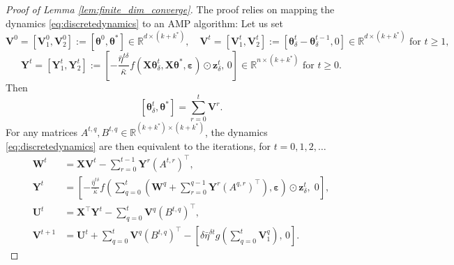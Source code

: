 \documentclass[11pt,letterpaper,reqno]{amsart}
\theoremstyle{definition}
\def\R{\mathbb{R}}
\def\z{\mathbf{z}}
\def\U{\mathbf{U}}
\def\V{\mathbf{V}}
\def\W{\mathbf{W}}
\def\X{\mathbf{X}}
\def\Y{\mathbf{Y}}
\def\beps{\boldsymbol{\varepsilon}}
\def\btheta{\boldsymbol{\theta}}
\begin{document}
\begin{proof}[Proof of Lemma \ref{lem:finite_dim_converge}]
The proof relies on mapping the dynamics \eqref{eq:discretedynamics} to an
AMP algorithm: Let us set
\[\V^0=[\V_1^0,\V_2^0]:=[\btheta^0,\btheta^*] \in \R^{d \times (k+k^*)},
\quad \V^t=[\V_1^t,\V_2^t]:=[\btheta_\delta^t-\btheta_\delta^{t-1},0]
\in \R^{d \times (k+k^*)} \text{ for } t \geq 1,\]
\[\Y^t=[\Y_1^t,\Y_2^t]:=\left[{-}\frac{\bar\eta^{t\delta}}{\bar\kappa}f(\X\btheta_\delta^t,\X\btheta^*,\beps)
\odot \z_\delta^t,\,0\right] \in \R^{n
\times (k+k^*)} \text{ for } t \geq 0.\]
Then
\begin{equation}\label{eq:thetaV}
[\btheta_\delta^t,\btheta^*]=\sum_{r=0}^t \V^r.
\end{equation}
For any matrices $A^{t,q},B^{t,q} \in \R^{(k+k^*) \times
(k+k^*)}$, the dynamics \eqref{eq:discretedynamics} are then equivalent to the
iterations, for $t=0,1,2,\ldots$
\begin{align}
\W^t&=\X\V^t-\sum_{r=0}^{t-1} \Y^r (A^{t,r})^\top,\label{eq:AMPW}\\
\Y^t&=\left[{-}\frac{\bar\eta^{t\delta}}{\bar\kappa}
f\left(\sum_{q=0}^t \left(\W^q+\sum_{r=0}^{q-1} \Y^r
(A^{q,r})^\top\right),\beps\right) \odot \z_\delta^t,\;0\right],\label{eq:AMPY}\\
\U^t&=\X^\top \Y^t-\sum_{q=0}^t \V^q (B^{t,q})^\top,\label{eq:AMPU}\\
\V^{t+1}&=\U^t+\sum_{q=0}^t \V^q (B^{t,q})^\top
-\left[\delta\bar\eta^{\delta t}g\left(\sum_{q=0}^t
\V_1^q\right),\,0\right].\label{eq:AMPV}
\end{align}


\end{proof}
\end{document}
